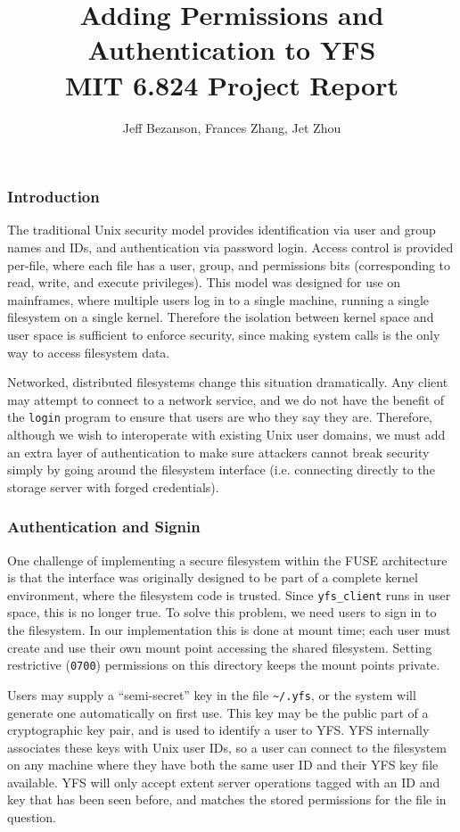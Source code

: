 \documentclass[12pt]{article}
\title{Adding Permissions and Authentication to YFS \\ MIT 6.824 Project Report}
\author{Jeff Bezanson, Frances Zhang, Jet Zhou}
\begin{document}
\maketitle

\setcounter{secnumdepth}{1}

\subsubsection{Introduction}

The traditional Unix security model provides identification via user
and group names and IDs, and authentication via password login.
Access control is provided per-file, where each file
has a user, group, and permissions bits (corresponding to read, write,
and execute privileges). This model was designed for use on mainframes,
where multiple users log in to a single machine, running a single
filesystem on a single kernel. Therefore the isolation between kernel
space and user space is sufficient to enforce security, since making
system calls is the only way to access filesystem data.

Networked, distributed filesystems change this situation dramatically.
Any client may attempt to connect to a network service, and we do not
have the benefit of the {\tt login} program to ensure that users are
who they say they are. Therefore, although we wish to interoperate with
existing Unix user domains, we must add an extra layer of authentication
to make sure attackers cannot break security simply by going around the
filesystem interface (i.e. connecting directly to the storage server
with forged credentials).

\subsubsection{Authentication and Signin}

One challenge of implementing a secure filesystem within the FUSE
architecture is that the interface was originally designed to be
part of a complete kernel environment, where the filesystem code
is trusted. Since {\tt yfs\_client} runs in user space, this is no
longer true.
To solve this problem, we need users to sign in to the filesystem.
In our implementation this is done at mount time; each user must
create and use their own mount point accessing the shared filesystem.
Setting restrictive ({\tt 0700}) permissions on this directory keeps
the mount points private.

Users may supply a ``semi-secret'' key in the file {\tt \~{}/.yfs}, or
the system will generate one automatically on first use. This key may
be the public part of a cryptographic key pair, and is used to identify
a user to YFS. YFS internally associates these keys with Unix user IDs,
so a user can connect to the filesystem on any machine where they have
both the same user ID and their YFS key file available. YFS will
only accept extent server operations tagged with an ID and key that has
been seen before, and matches the stored permissions for the file in
question.
\end{document}
